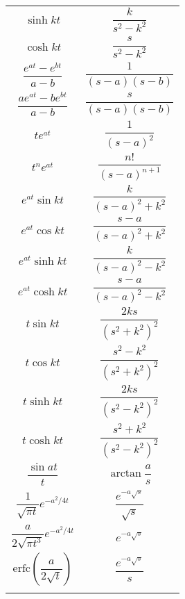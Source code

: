 \documentclass[a4paper, 10pt, ]{article}
\begin{document}
\begin{longtable}{cc}
        $\sinh kt$	                            & $\dfrac{k}{s^2-k^2}$                                   \\ \addlinespace[3mm]
        $\cosh kt$	                            & $\dfrac{s}{s^2-k^2}$                                   \\ \addlinespace[3mm]
        $\dfrac{e^{at}-e^{bt}}{a-b}$	        & $\dfrac{1}{(s-a)(s-b)}$                                  \\ \addlinespace[3mm]
        $\dfrac{ae^{at}-be^{bt}}{a-b}$	        & $\dfrac{s}{(s-a)(s-b)}$                                \\ \addlinespace[3mm]
        $te^{at}$	                            & $\dfrac{1}{(s-a)^2}$	                                   \\ \addlinespace[3mm]
        $t^ne^{at}$	                            & $\dfrac{n!}{(s-a)^{n+1}}$	                                \\ \addlinespace[3mm]
        $e^{at}\sin kt$	                        & $\dfrac{k}{(s-a)^2+k^2}$                                  \\ \addlinespace[3mm]
        $e^{at}\cos kt$	                        & $\dfrac{s-a}{(s-a)^2+k^2}$                                \\ \addlinespace[3mm]
        $e^{at}\sinh kt$	                    & $\dfrac{k}{(s-a)^2-k^2}$                                 \\ \addlinespace[3mm]
        $e^{at}\cosh kt$	                    & $\dfrac{s-a}{(s-a)^2-k^2}$                               \\ \addlinespace[3mm]
        $t\sin kt$  	                        & $\dfrac{2ks}{(s^2+k^2)^2}$                               \\ \addlinespace[3mm]
        $t\cos kt$  	                        & $\dfrac{s^2-k^2}{(s^2+k^2)^2}$                           \\ \addlinespace[3mm]
        $t\sinh kt$  	                        & $\dfrac{2ks}{(s^2-k^2)^2}$                              \\ \addlinespace[3mm]
        $t\cosh kt$  	                        & $\dfrac{s^2+k^2}{(s^2-k^2)^2}$                          \\ \addlinespace[3mm]
        $\dfrac{\sin at}{t}$	                & $\arctan \dfrac{a}{s}$                                   \\ \addlinespace[3mm]
        $\dfrac{1}{\sqrt{\pi t}}e^{-a^2/4t}$	& $\dfrac{e^{-a\sqrt{s}}}{\sqrt{s}}$                           \\ \addlinespace[3mm]
        $\dfrac{a}{2\sqrt{\pi t^3}}e^{-a^2/4t}$	& $e^{-a\sqrt{s}}$                                      \\ \addlinespace[3mm]
        $\text{erfc}\left(\dfrac{a}{2\sqrt{t}}\right)$ &  $\dfrac{e^{-a\sqrt{s}}}{s}$                       \\ \addlinespace[3mm]


    \end{longtable}
\end{document}
